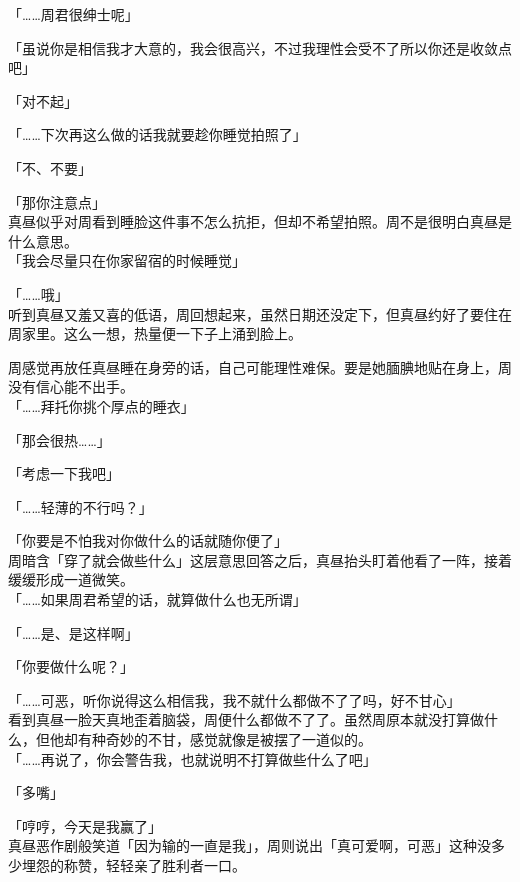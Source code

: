 「……周君很绅士呢」

「虽说你是相信我才大意的，我会很高兴，不过我理性会受不了所以你还是收敛点吧」

「对不起」

「……下次再这么做的话我就要趁你睡觉拍照了」

「不、不要」

「那你注意点」\\

真昼似乎对周看到睡脸这件事不怎么抗拒，但却不希望拍照。周不是很明白真昼是什么意思。\\

「我会尽量只在你家留宿的时候睡觉」

「……哦」\\

听到真昼又羞又喜的低语，周回想起来，虽然日期还没定下，但真昼约好了要住在周家里。这么一想，热量便一下子上涌到脸上。

周感觉再放任真昼睡在身旁的话，自己可能理性难保。要是她腼腆地贴在身上，周没有信心能不出手。\\

「……拜托你挑个厚点的睡衣」

「那会很热……」

「考虑一下我吧」

「……轻薄的不行吗？」

「你要是不怕我对你做什么的话就随你便了」\\

周暗含「穿了就会做些什么」这层意思回答之后，真昼抬头盯着他看了一阵，接着缓缓形成一道微笑。\\

「……如果周君希望的话，就算做什么也无所谓」

「……是、是这样啊」

「你要做什么呢？」

「……可恶，听你说得这么相信我，我不就什么都做不了了吗，好不甘心」\\

看到真昼一脸天真地歪着脑袋，周便什么都做不了了。虽然周原本就没打算做什么，但他却有种奇妙的不甘，感觉就像是被摆了一道似的。\\

「……再说了，你会警告我，也就说明不打算做些什么了吧」

「多嘴」

「哼哼，今天是我赢了」\\

真昼恶作剧般笑道「因为输的一直是我」，周则说出「真可爱啊，可恶」这种没多少埋怨的称赞，轻轻亲了胜利者一口。

